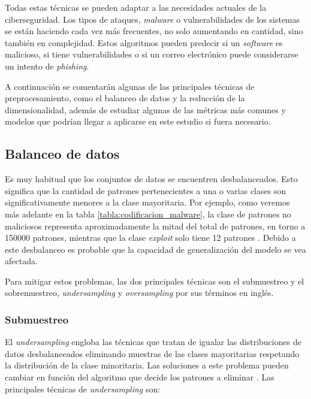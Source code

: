 Todas estas técnicas se pueden adaptar a las necesidades actuales de la ciberseguridad. Los tipos de ataques, \textit{malware} o vulnerabilidades de los sistemas se están haciendo cada vez más frecuentes, no solo aumentando en cantidad, sino también en complejidad. Estos algoritmos pueden predecir si un \textit{software} es malicioso, si tiene vulnerabilidades o si un correo electrónico puede considerarse un intento de \textit{phishing}.

\vspace{1em}

A continuación se comentarán algunas de las principales técnicas de preprocesamiento, como el balanceo de datos y la reducción de la dimensionalidad, además de estudiar algunas de las métricas más comunes y modelos que podrían llegar a aplicarse en este estudio si fuera necesario.

\subsection{Balanceo de datos}
\label{subsec:balanceo}

Es muy habitual que los conjuntos de datos se encuentren desbalanceados. Esto significa que la cantidad de patrones pertenecientes a una o varias clases son significativamente menores a la clase mayoritaria. Por ejemplo, como veremos más adelante en la tabla \ref{tabla:codificacion_malware}, la clase de patrones no maliciosos representa aproximadamente la mitad del total de patrones, en torno a 150000 patrones, mientras que la clase \textit{exploit} solo tiene 12 patrones \cite{balanceo}. Debido a este desbalanceo es probable que la capacidad de generalización del modelo se vea afectada.

\vspace{1em}

Para mitigar estos problemas, las dos principales técnicas son el submuestreo y el sobremuestreo, \textit{undersampling} y \textit{oversampling} por sus términos en inglés.

\newpage
\subsubsection{Submuestreo}
\label{subsubsec:undersampling}

El \textit{undersampling} engloba las técnicas que tratan de igualar las distribuciones de datos desbalanceados eliminando muestras de las clases mayoritarias respetando la distribución de la clase minoritaria. Las soluciones a este problema pueden cambiar en función del algoritmo que decide los patrones a eliminar \cite{resamplig}. Las principales técnicas de \textit{undersampling} son:

